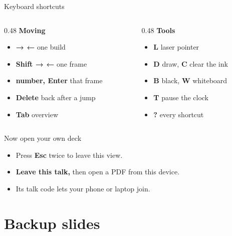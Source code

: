\documentclass[aspectratio=169,14pt]{beamer}
\newcommand{\key}[1]{\textbf{#1}}
\begin{document}
\begin{frame}{Keyboard shortcuts}
  \begin{columns}[T]
    \begin{column}{0.48\textwidth}
      \textbf{Moving}
      \begin{itemize}
        \item \key{→ ←} one build
        \item \key{Shift → ←} one frame
        \item \key{number, Enter} that frame
        \item \key{Delete} back after a jump
        \item \key{Tab} overview
      \end{itemize}
    \end{column}
    \begin{column}{0.48\textwidth}
      \textbf{Tools}
      \begin{itemize}
        \item \key{L} laser pointer
        \item \key{D} draw, \key{C} clear the ink
        \item \key{B} black, \key{W} whiteboard
        \item \key{T} pause the clock
        \item \key{?} every shortcut
      \end{itemize}
    \end{column}
  \end{columns}
\end{frame}

\begin{frame}{Now open your own deck}
  \begin{itemize}
    \item Press \key{Esc} twice to leave this view.
    \item \textbf{Leave this talk,} then open a PDF from this device.
    \item Its talk code lets your phone or laptop join.
  \end{itemize}
\end{frame}

\appendix
\section{Backup slides}
\end{document}
